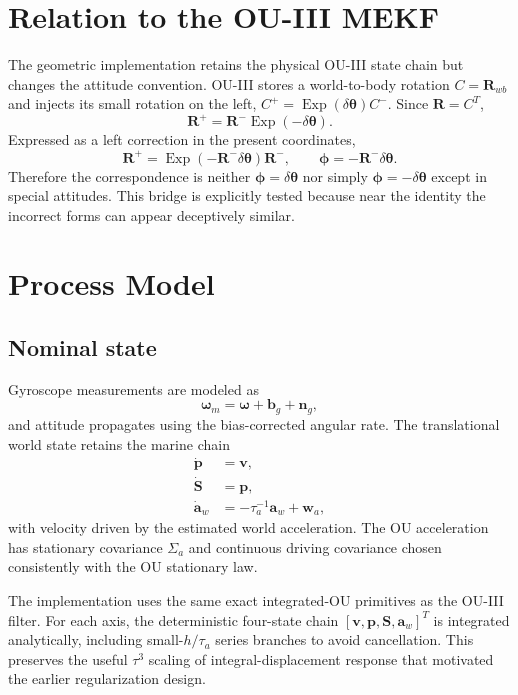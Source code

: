 \documentclass[conference]{IEEEtran}
\DeclareMathOperator{\Exp}{Exp}
\theoremstyle{bodysmall}
\begin{document}
\section{Relation to the OU-III MEKF}
The geometric implementation retains the physical OU-III state chain but changes the attitude convention. OU-III stores a world-to-body rotation $C=\bm{R}_{wb}$ and injects its small rotation on the left, $C^+=\Exp(\delta\bm{\theta})C^-$. Since $\bm{R}=C^T$,
\begin{equation}
\bm{R}^+=\bm{R}^-\Exp(-\delta\bm{\theta}).
\end{equation}
Expressed as a left correction in the present coordinates,
\begin{equation}
\bm{R}^+=\Exp(-\bm{R}^-\delta\bm{\theta})\bm{R}^-,\qquad
\bm{\phi}=-\bm{R}^-\delta\bm{\theta}.
\end{equation}
Therefore the correspondence is neither $\bm{\phi}=\delta\bm{\theta}$ nor simply $\bm{\phi}=-\delta\bm{\theta}$ except in special attitudes. This bridge is explicitly tested because near the identity the incorrect forms can appear deceptively similar.

\section{Process Model}
\subsection{Nominal state}
Gyroscope measurements are modeled as
\begin{equation}
\bm{\omega}_m=\bm{\omega}+\bm{b}_g+\bm{n}_g,
\end{equation}
and attitude propagates using the bias-corrected angular rate. The translational world state retains the marine chain
\begin{align}
\dot {\bm{p}} &= \bm{v},\\
\dot {\bm{S}} &= \bm{p},\\
\dot {\bm{a}}_w &= -\tau_a^{-1}\bm{a}_w+\bm{w}_a,
\end{align}
with velocity driven by the estimated world acceleration. The OU acceleration has stationary covariance $\Sigma_a$ and continuous driving covariance chosen consistently with the OU stationary law.

The implementation uses the same exact integrated-OU primitives as the OU-III filter. For each axis, the deterministic four-state chain $[\bm{v},\bm{p},\bm{S},\bm{a}_w]^T$ is integrated analytically, including small-$h/\tau_a$ series branches to avoid cancellation. This preserves the useful $\tau^3$ scaling of integral-displacement response that motivated the earlier regularization design.
\end{document}
